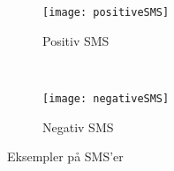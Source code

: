 	\begin{figure}
		\centering
		\begin{subfigure}[b]{0.4\textwidth}
			\texttt{[image: positiveSMS]}
			\caption{Positiv SMS}
		\end{subfigure}
		~
		\begin{subfigure}[b]{0.4\textwidth}
			\texttt{[image: negativeSMS]}
			\caption{Negativ SMS}
		\end{subfigure}
		\caption{Eksempler på SMS'er}
	\end{figure}